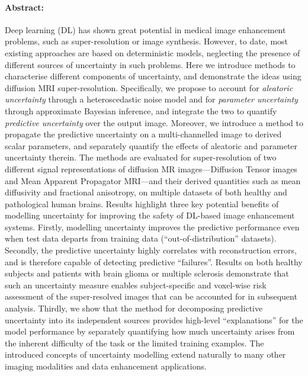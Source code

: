 \paragraph{Abstract: }
Deep learning (DL) has shown great potential in medical image enhancement problems, such as super-resolution or image synthesis. However, to date, most existing approaches are based on deterministic models, neglecting the presence of different sources of uncertainty in such problems. Here we introduce methods to characterise different components of uncertainty, and demonstrate the ideas using diffusion MRI super-resolution.  Specifically, we propose to account for \textit{aleatoric uncertainty} through a heteroscedastic noise model and for \textit{parameter uncertainty} through approximate Bayesian inference, and integrate the two to quantify \textit{predictive uncertainty} over the output image. Moreover, we introduce a method to propagate the predictive uncertainty on a multi-channelled image to derived scalar parameters, and separately quantify the effects of aleatoric and parameter uncertainty therein. The methods are evaluated for super-resolution of two different signal representations of diffusion MR images---Diffusion Tensor images and Mean Apparent Propagator MRI---and their derived quantities such as mean diffusivity and fractional anisotropy, on multiple datasets of both healthy and pathological human brains. Results highlight three key potential benefits of modelling uncertainty for improving the safety of DL-based image enhancement systems. Firstly, modelling uncertainty improves the predictive performance even when test data departs from training data (``out-of-distribution'' datasets). Secondly, the predictive uncertainty highly correlates with reconstruction errors, and is therefore capable of detecting predictive ``failures''. Results on both healthy subjects and patients with brain glioma or multiple sclerosis demonstrate that such an uncertainty measure enables subject-specific and voxel-wise risk assessment of the super-resolved images that can be accounted for in subsequent analysis. Thirdly, we show that the method for decomposing predictive uncertainty into its independent sources provides high-level ``explanations'' for the model performance by separately quantifying how much uncertainty arises from the inherent difficulty of the task or the limited training examples. The introduced concepts of uncertainty modelling extend naturally to many other imaging modalities and data enhancement applications.
